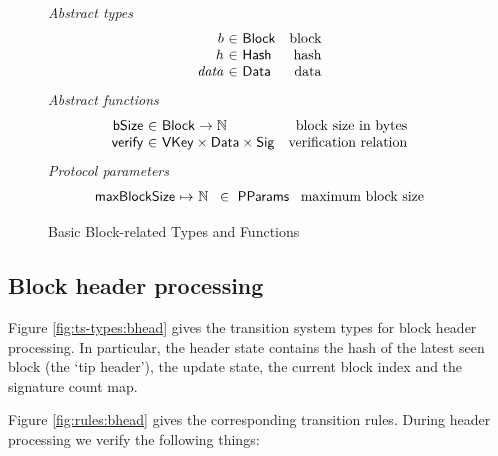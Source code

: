 \documentclass[11pt,a4paper]{article}
\newcommand{\var}[1]{\mathit{#1}}
\newcommand{\fun}[1]{\mathsf{#1}}
\newcommand{\type}[1]{\mathsf{#1}}
\newcommand{\totalf}{\to}
\newcommand{\partialf}{\mapsto}
\newcommand{\Hash}{\type{Hash}}  %
\newcommand{\Block}{\type{Block}}
\newcommand{\VKey}{\type{VKey}}
\newcommand{\Sig}{\type{Sig}}
\newcommand{\Data}{\type{Data}}
\newcommand{\ProtParams}{\type{PParams}} %
\newcommand{\bsizename}{bSize}
\newcommand{\verifyname}{verify}
\begin{document}
\begin{figure}[ht]
  \emph{Abstract types}
  \begin{equation*}
    \begin{array}{r@{~\in~}lr}
      b & \Block & \text{block} \\
      h & \Hash   & \text{hash} \\
      \var{data} & \Data    & \text{data}
    \end{array}
  \end{equation*}
  \emph{Abstract functions}
  \begin{equation*}
    \begin{array}{r@{~\in~}lr}
      \fun{\bsizename} & \Block \totalf \mathbb{N} & \text{block size in bytes} \\
      \fun{\verifyname} & \VKey \times \Data \times \Sig & \text{verification relation} \\
    \end{array}
  \end{equation*}
  \emph{Protocol parameters}
  \begin{equation*}
    \begin{array}{r@{~\partialf~}l!{~\in~\ProtParams~}r}
      \maxblocksize & \mathbb{N} & \text{maximum block size} \\
    \end{array}
  \end{equation*}
  \caption{Basic Block-related Types and Functions}
  \label{fig:block-defs}
\end{figure}

\subsection{Block header processing}

Figure \ref{fig:ts-types:bhead} gives the transition system types for block
header processing. In particular, the header state contains the hash of the
latest seen block (the `tip header'), the update state, the current block index
and the signature count map.

Figure \ref{fig:rules:bhead} gives the corresponding transition rules. During
header processing we verify the following things:
\end{document}
